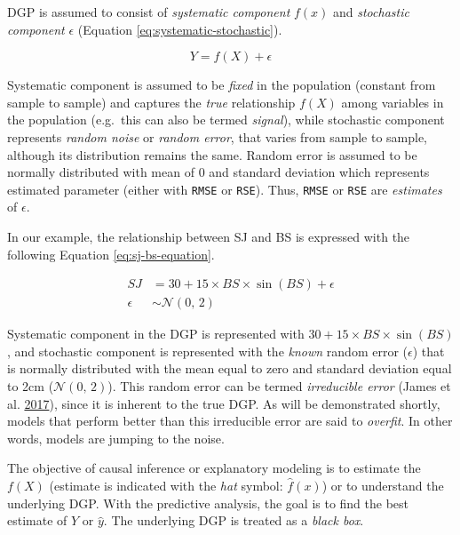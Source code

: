 \documentclass[
]{book}
\begin{document}
DGP is assumed to consist of \emph{systematic component} \(f(x)\) and \emph{stochastic component} \(\epsilon\) (Equation \eqref{eq:systematic-stochastic}).

\begin{equation}
  Y = f(X) + \epsilon
  \label{eq:systematic-stochastic}
\end{equation}

Systematic component is assumed to be \emph{fixed} in the population (constant from sample to sample) and captures the \emph{true} relationship \(f(X)\) among variables in the population (e.g.~this can also be termed \emph{signal}), while stochastic component represents \emph{random noise} or \emph{random error}, that varies from sample to sample, although its distribution remains the same. Random error is assumed to be normally distributed with mean of 0 and standard deviation which represents estimated parameter (either with \texttt{RMSE} or \texttt{RSE}). Thus, \texttt{RMSE} or \texttt{RSE} are \emph{estimates} of \(\epsilon\).

In our example, the relationship between SJ and BS is expressed with the following Equation \eqref{eq:sj-bs-equation}.

\begin{equation}
  \begin{split}
    SJ &= 30 + 15\times BS\times\sin(BS)+\epsilon \\
    \epsilon &\sim \mathcal{N}(0,\,2)
  \end{split}
  \label{eq:sj-bs-equation}
\end{equation}

Systematic component in the DGP is represented with \(30 + 15\times BS\times\sin(BS)\), and stochastic component is represented with the \emph{known} random error (\(\epsilon\)) that is normally distributed with the mean equal to zero and standard deviation equal to 2cm (\(\mathcal{N}(0,\,2)\)). This random error can be termed \emph{irreducible error} (James et al. \protect\hyperlink{ref-jamesIntroductionStatisticalLearning2017}{2017}), since it is inherent to the true DGP. As will be demonstrated shortly, models that perform better than this irreducible error are said to \emph{overfit}. In other words, models are jumping to the noise.

The objective of causal inference or explanatory modeling is to estimate the \(f(X)\) (estimate is indicated with the \emph{hat} symbol: \(\hat{f}(x)\)) or to understand the underlying DGP. With the predictive analysis, the goal is to find the best estimate of \(Y\) or \(\hat{y}\). The underlying DGP is treated as a \emph{black box}.
\end{document}

